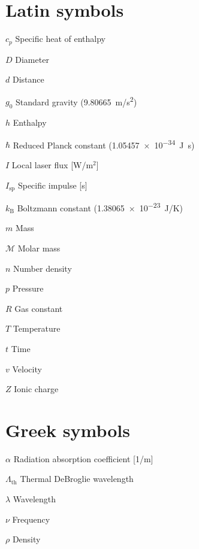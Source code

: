 \begin{multicols*}{2}
    \section*{Latin symbols}
    \begin{nomlist}
        \item[$c_p$]            Specific heat of enthalpy
        \item[$D$]              Diameter
        \item[$d$]              Distance
        \item[$g_0$]            Standard gravity (9.80665~\unit{m/s^2}) 
        \item[$h$]              Enthalpy
        \item[$\hbar$]          Reduced Planck constant (\qty{1.05457e-34}{J.s})
        \item[$I$]              Local laser flux [W/m$^2$]
        \item[$I_\text{sp}$]    Specific impulse [s]
        \item[$k_\mathrm{B}$]   Boltzmann constant (\qty{1.38065e-23}{J/K})
        \item[$m$]              Mass
        \item[$\mathcal{M}$]    Molar mass
        \item[$n$]              Number density 
        \item[$p$]              Pressure
        \item[$R$]              Gas constant
        \item[$T$]              Temperature
        \item[$t$]              Time
        \item[$v$]              Velocity
        \item[$Z$]              Ionic charge
    \end{nomlist}

    \section*{Greek symbols}
    \begin{nomlist}
        \item[$\alpha$]         Radiation absorption coefficient [1/m]
        \item[$\Lambda_\mathrm{th}$]        Thermal DeBroglie wavelength
        \item[$\lambda$]        Wavelength
        \item[$\nu$]            Frequency
        \item[$\rho$]           Density
    \end{nomlist}


\end{multicols*}

